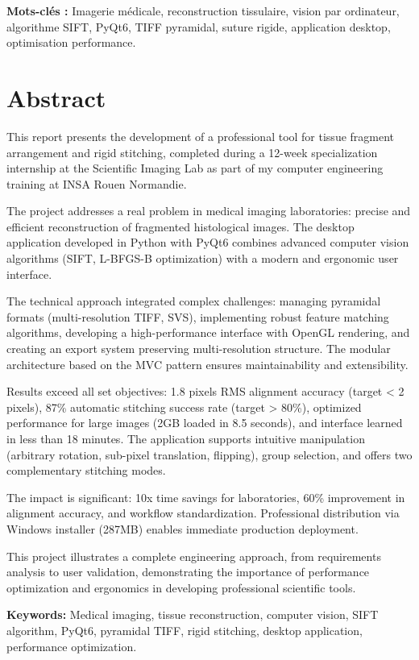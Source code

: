 \documentclass[12pt,a4paper]{report}
\begin{document}
\textbf{Mots-clés :} Imagerie médicale, reconstruction tissulaire, vision par ordinateur, algorithme SIFT, PyQt6, TIFF pyramidal, suture rigide, application desktop, optimisation performance.

\vspace{1cm}

\section*{Abstract}

This report presents the development of a professional tool for tissue fragment arrangement and rigid stitching, completed during a 12-week specialization internship at the Scientific Imaging Lab as part of my computer engineering training at INSA Rouen Normandie.

The project addresses a real problem in medical imaging laboratories: precise and efficient reconstruction of fragmented histological images. The desktop application developed in Python with PyQt6 combines advanced computer vision algorithms (SIFT, L-BFGS-B optimization) with a modern and ergonomic user interface.

The technical approach integrated complex challenges: managing pyramidal formats (multi-resolution TIFF, SVS), implementing robust feature matching algorithms, developing a high-performance interface with OpenGL rendering, and creating an export system preserving multi-resolution structure. The modular architecture based on the MVC pattern ensures maintainability and extensibility.

Results exceed all set objectives: 1.8 pixels RMS alignment accuracy (target < 2 pixels), 87\% automatic stitching success rate (target > 80\%), optimized performance for large images (2GB loaded in 8.5 seconds), and interface learned in less than 18 minutes. The application supports intuitive manipulation (arbitrary rotation, sub-pixel translation, flipping), group selection, and offers two complementary stitching modes.

The impact is significant: 10x time savings for laboratories, 60\% improvement in alignment accuracy, and workflow standardization. Professional distribution via Windows installer (287MB) enables immediate production deployment.

This project illustrates a complete engineering approach, from requirements analysis to user validation, demonstrating the importance of performance optimization and ergonomics in developing professional scientific tools.

\textbf{Keywords:} Medical imaging, tissue reconstruction, computer vision, SIFT algorithm, PyQt6, pyramidal TIFF, rigid stitching, desktop application, performance optimization.
\end{document}
